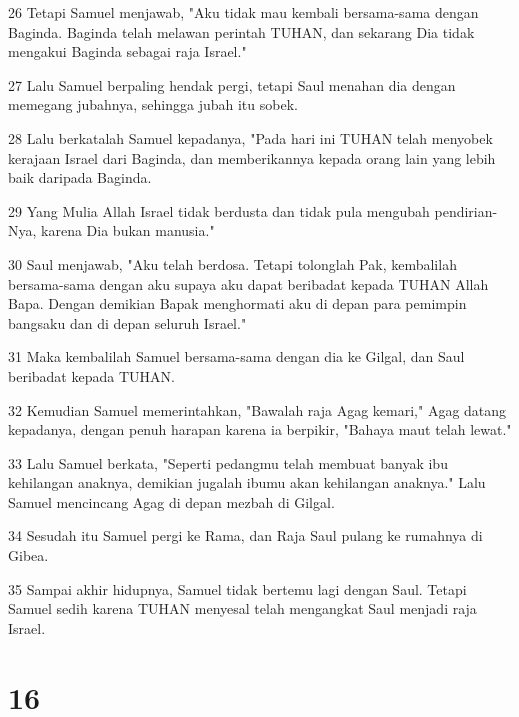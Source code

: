 \par 26 Tetapi Samuel menjawab, "Aku tidak mau kembali bersama-sama dengan Baginda. Baginda telah melawan perintah TUHAN, dan sekarang Dia tidak mengakui Baginda sebagai raja Israel."
\par 27 Lalu Samuel berpaling hendak pergi, tetapi Saul menahan dia dengan memegang jubahnya, sehingga jubah itu sobek.
\par 28 Lalu berkatalah Samuel kepadanya, "Pada hari ini TUHAN telah menyobek kerajaan Israel dari Baginda, dan memberikannya kepada orang lain yang lebih baik daripada Baginda.
\par 29 Yang Mulia Allah Israel tidak berdusta dan tidak pula mengubah pendirian-Nya, karena Dia bukan manusia."
\par 30 Saul menjawab, "Aku telah berdosa. Tetapi tolonglah Pak, kembalilah bersama-sama dengan aku supaya aku dapat beribadat kepada TUHAN Allah Bapa. Dengan demikian Bapak menghormati aku di depan para pemimpin bangsaku dan di depan seluruh Israel."
\par 31 Maka kembalilah Samuel bersama-sama dengan dia ke Gilgal, dan Saul beribadat kepada TUHAN.
\par 32 Kemudian Samuel memerintahkan, "Bawalah raja Agag kemari," Agag datang kepadanya, dengan penuh harapan karena ia berpikir, "Bahaya maut telah lewat."
\par 33 Lalu Samuel berkata, "Seperti pedangmu telah membuat banyak ibu kehilangan anaknya, demikian jugalah ibumu akan kehilangan anaknya." Lalu Samuel mencincang Agag di depan mezbah di Gilgal.
\par 34 Sesudah itu Samuel pergi ke Rama, dan Raja Saul pulang ke rumahnya di Gibea.
\par 35 Sampai akhir hidupnya, Samuel tidak bertemu lagi dengan Saul. Tetapi Samuel sedih karena TUHAN menyesal telah mengangkat Saul menjadi raja Israel.

\chapter{16}

